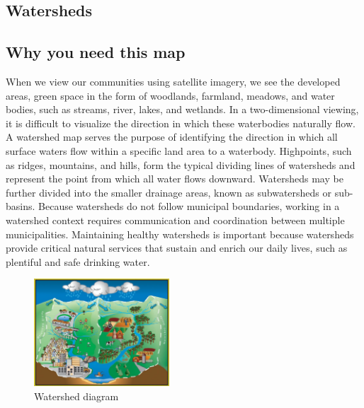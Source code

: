 \subsection{Watersheds}\label{subsec:watersheds}
\subsection*{Why you need this map}
When we view our communities using satellite imagery, we see the developed 
areas, green space in the form of woodlands, farmland, meadows, and water 
bodies, such as streams, river, lakes, and wetlands. In a two-dimensional 
viewing, it is difficult to visualize the direction in which these waterbodies 
naturally flow. A watershed map serves the purpose of identifying the direction 
in which all surface waters flow within a specific land area to a waterbody. 
Highpoints, such as ridges, mountains, and hills, form the typical dividing 
lines of watersheds and represent the point from which all water flows 
downward. Watersheds may be further divided into the smaller drainage areas, 
known as subwatersheds or sub-basins. Because watersheds do not follow 
municipal boundaries, working in a watershed context requires communication and 
coordination between multiple municipalities. Maintaining healthy watersheds is 
important because watersheds provide critical natural services that sustain and 
enrich our daily lives, such as plentiful and safe drinking water.

\begin{figure}
  \centering
    \includegraphics[width=0.45\textwidth]{images/watershed_riveralliance.jpg}
  \caption{Watershed diagram}\label{fig:watershed}
  \vspace{-20pt}
\end{figure}

